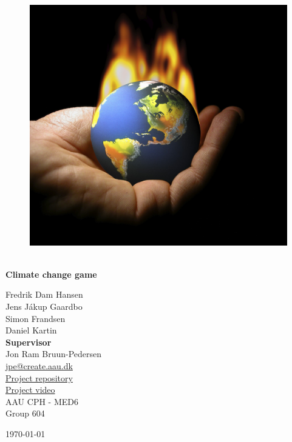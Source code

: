 \begin{titlepage}
			
\addtolength{\voffset}{2cm}

\begin{figure}[H]
\centering
\vspace{2cm}	%
\includegraphics[width=0.8\linewidth]{figure/Frontpage/frontpage}
\end{figure}

\mbox{}
\vfill
\renewcommand{\familydefault}{\sfdefault} \normalfont %
\HRule\\[0.1cm]
\textbf{{{\Huge Climate change game}}} \hspace{0.15cm}\\
\HRule\smallskip{}
\begin{multicols}{2}
{\Large Fredrik Dam Hansen\\Jens Jákup Gaardbo\\Simon Frandsen\\Daniel Kartin\columnbreak}\\
\setlength{\parskip}{2.4cm}
{\Large{\textbf{Supervisor}\\Jon Ram Bruun-Pedersen\\\href{mailto:jpe@create.aau.dk}{\color{blue}jpe@create.aau.dk}}}\medskip\\
\href{https://github.com/Medialogy508/beAPenguin}{\color{blue}Project repository}\\
\href{https://www.youtube.com/watch?v=Rl-HKPNP9ZY}{\color{blue}Project video}\medskip
\\\small AAU CPH - 
MED6 \\
Group 604\\
\end{multicols}
\today
\renewcommand{\familydefault}{\rmdefault} \normalfont %
\end{titlepage}


